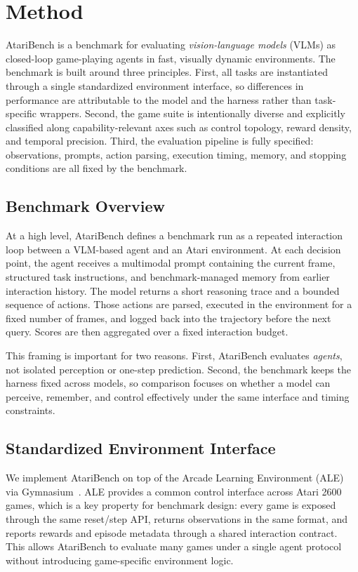 \section{Method}

AtariBench is a benchmark for evaluating \emph{vision-language models} (VLMs) as closed-loop game-playing agents in fast, visually dynamic environments. The benchmark is built around three principles. First, all tasks are instantiated through a single standardized environment interface, so differences in performance are attributable to the model and the harness rather than task-specific wrappers. Second, the game suite is intentionally diverse and explicitly classified along capability-relevant axes such as control topology, reward density, and temporal precision. Third, the evaluation pipeline is fully specified: observations, prompts, action parsing, execution timing, memory, and stopping conditions are all fixed by the benchmark.

\subsection{Benchmark Overview}

At a high level, AtariBench defines a benchmark run as a repeated interaction loop between a VLM-based agent and an Atari environment. At each decision point, the agent receives a multimodal prompt containing the current frame, structured task instructions, and benchmark-managed memory from earlier interaction history. The model returns a short reasoning trace and a bounded sequence of actions. Those actions are parsed, executed in the environment for a fixed number of frames, and logged back into the trajectory before the next query. Scores are then aggregated over a fixed interaction budget.

This framing is important for two reasons. First, AtariBench evaluates \emph{agents}, not isolated perception or one-step prediction. Second, the benchmark keeps the harness fixed across models, so comparison focuses on whether a model can perceive, remember, and control effectively under the same interface and timing constraints.

\subsection{Standardized Environment Interface}

We implement AtariBench on top of the Arcade Learning Environment (ALE)~\citep{ale} via Gymnasium~\citep{gymnasium,openai_gym}. ALE provides a common control interface across Atari 2600 games, which is a key property for benchmark design: every game is exposed through the same reset/step API, returns observations in the same format, and reports rewards and episode metadata through a shared interaction contract. This allows AtariBench to evaluate many games under a single agent protocol without introducing game-specific environment logic.

